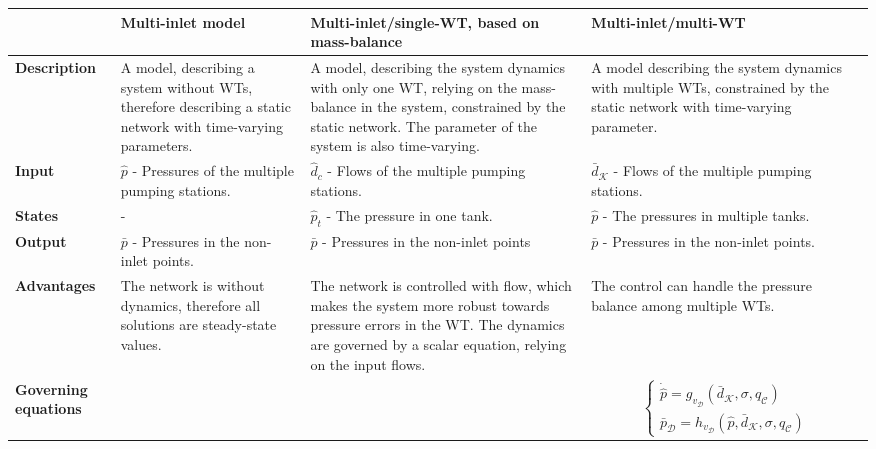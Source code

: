 \begin{center}
    \begin{tabular}{ | >{\centering\arraybackslash}m{1.8cm} | >{\centering\arraybackslash}m{3.6cm} | >{\centering\arraybackslash}m{3.6cm} | >{\centering\arraybackslash}m{3.6cm} |}
    \hline
    \multirow{1}{*}
     & \textbf{Multi-inlet model} & \textbf{Multi-inlet/single-WT, based on mass-balance} & \textbf{Multi-inlet/multi-WT} \\ 
     \hline
     \multirow{1}{*}
    \textbf{Description} & A model, describing a system without WTs, therefore describing a static network with time-varying parameters. & A model, describing the system dynamics with only one WT, relying on the mass-balance in the system, constrained by the static network. The parameter of the system is also time-varying. & A model describing the system dynamics with multiple WTs, constrained by the static network with time-varying parameter.\\ 
    \hline
      \multirow{1}{*}
    \textbf{Input} & $\hat{p}$ - Pressures of the multiple pumping stations. & $\hat{d}_c$ - Flows of the multiple pumping stations. & $\bar{d}_{\mathcal{K}}$ - Flows of the multiple pumping stations.\\ 
    \hline
      \multirow{1}{*}
    \textbf{States} & - & $\hat{p}_t$ - The pressure in one tank. & $\hat{p}$ - The pressures in multiple tanks.\\ 
    \hline
      \multirow{1}{*}
    \textbf{Output} & $\bar{p}$ - Pressures in the non-inlet points. & $\bar{p}$ - Pressures in the non-inlet points & $\bar{p}$ - Pressures in the non-inlet points.\\ 
    \hline
      \multirow{1}{*}
    \textbf{Advantages} & The network is without dynamics, therefore all solutions are steady-state values. & The network is controlled with flow, which makes the system more robust towards pressure errors in the WT. The dynamics are governed by a scalar equation, relying on the input flows.  & The control can handle the pressure balance among multiple WTs.\\ 
    \hline
      \multirow{1}{*}
    \textbf{Governing equations} & 123 & 123 & \begin{equation*}
\label{final_flowmodel_abstract}
\begin{cases}
    \dot{\hat{p}} = g_{v_{\mathcal{D}}}( \bar{d}_{\mathcal{K}}, \sigma, q_\mathcal{C})\\
    \bar{p}_{\mathcal{D}} = h_{v_{\mathcal{D}}}(\hat{p}, \!\bar{d}_{\mathcal{K}}, \!\sigma, \! q_\mathcal{C})

\end{cases}
\end{equation*}
\end{tabular}
\end{center}
